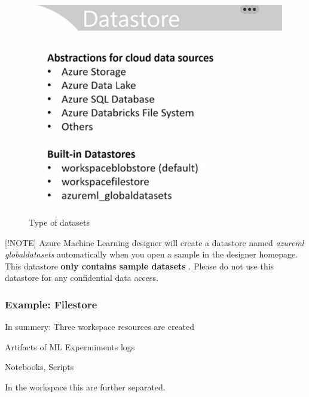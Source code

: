 \begin{figure}[H]
	\centering
	\includegraphics[scale = 0.3]{attachment/chapter_10/Scc029}
	\caption{Type of datasets}
\end{figure}

[!NOTE] Azure Machine Learning designer will create a datastore named \textit{azureml globaldatasets} automatically when you open a sample in the designer homepage. This datastore \textbf{only contains sample datasets} . Please do not use this datastore for any confidential data access.

\subsubsection{Example: Filestore}
In summery: Three workspace resources are created

	\begin{description}
		\centering
		\item[blobstore (default)] Artifacts of \gls{ML} Expermiments logs
		\item[filestore] Notebooks, Scripts
		\item[azureml globaldatasets]
	\end{description}

In the workspace this are further separated.

